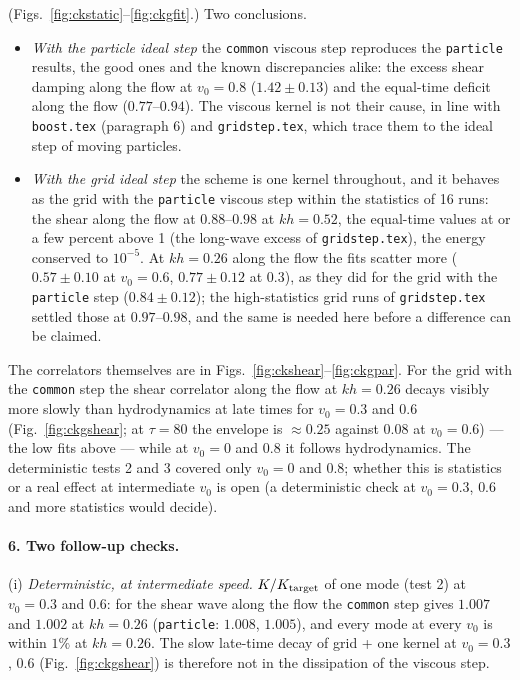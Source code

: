 \documentclass[11pt,aps,preprint,nofootinbib,superscriptaddress,tightenlines]{revtex4-2}
\def\Fig#1{Fig.~\ref{#1}}
\let\oldparagraph\paragraph
\renewcommand{\paragraph}{\par\bigskip\oldparagraph}
\begin{document}
(Figs.~\ref{fig:ckstatic}--\ref{fig:ckgfit}.)  Two conclusions.
\begin{itemize}
\item \emph{With the particle ideal step} the \texttt{common} viscous step reproduces the \texttt{particle} results, the good
  ones and the known discrepancies alike: the excess shear damping along the flow at $v_0=0.8$ ($1.42\pm0.13$) and
  the equal-time deficit along the flow ($0.77$--$0.94$).  The viscous kernel is not their cause, in line with
  \texttt{boost.tex} (paragraph 6) and \texttt{gridstep.tex}, which trace them to the ideal step of moving particles.
\item \emph{With the grid ideal step} the scheme is one kernel throughout, and it behaves as the grid with the
  \texttt{particle} viscous step within the statistics of 16 runs: the shear along the flow at $0.88$--$0.98$ at $kh=0.52$,
  the equal-time values at or a few percent above 1 (the long-wave excess of \texttt{gridstep.tex}), the energy
  conserved to $10^{-5}$.  At $kh=0.26$ along the flow the fits scatter more ($0.57\pm0.10$ at $v_0=0.6$, $0.77\pm0.12$ at
  $0.3$), as they did for the grid with the \texttt{particle} step ($0.84\pm0.12$); the high-statistics grid runs of \texttt{gridstep.tex}
  settled those at $0.97$--$0.98$, and the same is needed here before a difference can be claimed.
\end{itemize}
The correlators themselves are in Figs.~\ref{fig:ckshear}--\ref{fig:ckgpar}.  For the grid with the \texttt{common} step the
shear correlator along the flow at $kh=0.26$ decays visibly more slowly than hydrodynamics at late times for
$v_0=0.3$ and $0.6$ (\Fig{fig:ckgshear}; at $\tau=80$ the envelope is $\approx0.25$ against $0.08$ at $v_0=0.6$) --- the low fits above ---
while at $v_0=0$ and $0.8$ it follows hydrodynamics.  The deterministic tests 2 and 3 covered only $v_0=0$ and $0.8$;
whether this is statistics or a real effect at intermediate $v_0$ is open (a deterministic check at $v_0=0.3$, $0.6$ and
more statistics would decide).

\paragraph{6. Two follow-up checks.}  (i) \emph{Deterministic, at intermediate speed.}  $K/K_{\rm target}$ of one mode (test 2) at
$v_0=0.3$ and $0.6$: for the shear wave along the flow the \texttt{common} step gives $1.007$ and $1.002$ at $kh=0.26$ (\texttt{particle}:
$1.008$, $1.005$), and every mode at every $v_0$ is within $1\%$ at $kh=0.26$.  The slow late-time decay of grid + one
kernel at $v_0=0.3$, $0.6$ (\Fig{fig:ckgshear}) is therefore not in the dissipation of the viscous step.
\end{document}

